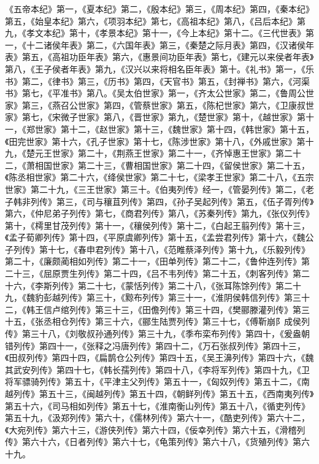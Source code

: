 \documentclass[]{article}
\begin{document}
《五帝本纪》第一，《夏本纪》第二，《殷本纪》第三，《周本纪》第四，《秦本纪》第五，《始皇本纪》第六，《项羽本纪》第七，《高祖本纪》第八，《吕后本纪》第九，《孝文本纪》第十，《孝景本纪》第十一，《今上本纪》第十二。《三代世表》第一，《十二诸侯年表》第二，《六国年表》第三，《秦楚之际月表》第四，《汉诸侯年表》第五，《高祖功臣年表》第六，《惠景间功臣年表》第七，《建元以来侯者年表》第八，《王子侯者年表》第九，《汉兴以来将相名臣年表》第十。《礼书》第一，《乐书》第二，《律书》第三，《历书》第四，《天官书》第五，《封禅书》第六，《河渠书》第七，《平准书》第八。《吴太伯世家》第一，《齐太公世家》第二，《鲁周公世家》第三，《燕召公世家》第四，《管蔡世家》第五，《陈杞世家》第六，《卫康叔世家》第七，《宋微子世家》第八，《晋世家》第九，《楚世家》第十，《越世家》第十一，《郑世家》第十二，《赵世家》第十三，《魏世家》第十四，《韩世家》第十五，《田完世家》第十六，《孔子世家》第十七，《陈涉世家》第十八，《外戚世家》第十九，《楚元王世家》第二十，《荆燕王世家》第二十一，《齐悼惠王世家》第二十二，《萧相国世家》第二十三，《曹相国世家》第二十四，《留侯世家》第二十五，《陈丞相世家》第二十六，《绛侯世家》第二十七，《梁孝王世家》第二十八，《五宗世家》第二十九，《三王世家》第三十。《伯夷列传》经一，《管晏列传》第二，《老子韩非列传》第三，《司与穰苴列传》第四，《孙子吴起列传》第五，《伍子胥列传》第六，《仲尼弟子列传》第七，《商君列传》第八，《苏秦列传》第九，《张仪列传》第十，《樗里甘茂列传》第十一，《穰侯列传》第十二，《白起王翦列传》第十三，《孟子荀卿列传》第十四，《平原虞卿列传》第十五，《孟尝君列传》第十六，《魏公子列传》第十七，《春申君列传》第十八，《范睢蔡泽列传》第十九，《乐毅列传》第二十，《廉颇蔺相如列传》第二十一，《田单列传》第二十二，《鲁仲连列传》第二十三，《屈原贾生列传》第二十四，《吕不韦列传》第二十五，《刺客列传》第二十六，《李斯列传》第二十七，《蒙恬列传》第二十八，《张耳陈馀列传》第二十九，《魏豹彭越列传》第三十，《黥布列传》第三十一，《淮阴侯韩信列传》第三十二，《韩王信卢绾列传》第三十三，《田儋列传》第三十四，《樊郦滕灌列传》第三十五，《张丞相仓列传》第三十六，《郦生陆贾列传》第三十七，《傅靳崩阝成侯列传》第三十八，《刘敬叔孙通列传》第三十九，《季布栾布列传》第四十，《爰盎朝错列传》第四十一，《张释之冯唐列传》第四十二，《万石张叔列传》第四十三，《田叔列传》第四十四，《扁鹊仓公列传》第四十五，《吴王濞列传》第四十六，《魏其武安列传》第四十七，《韩长孺列传》第四十八，《李将军列传》第四十九，《卫将军骠骑列传》第五十，《平津主父列传》第五十一，《匈奴列传》第五十二，《南越列传》第五十三，《闽越列传》第五十四，《朝鲜列传》第五十五，《西南夷列传》第五十六，《司马相如列传》第五十七，《淮南衡山列传》第五十八，《循吏列传》第五十九，《汲郑列传》第六十，《儒林列传》第六十一，《酷吏列传》第六十二，《大宛列传》第六十三，《游侠列传》第六十四，《佞幸列传》第六十五，《滑稽列传》第六十六，《日者列传》第六十七，《龟策列传》第六十八，《货殖列传》第六十九。
\end{document}
